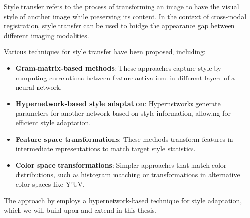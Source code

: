 Style transfer refers to the process of transforming an image to have the visual style of another image while preserving its content. In the context of cross-modal registration, style transfer can be used to bridge the appearance gap between different imaging modalities.

Various techniques for style transfer have been proposed, including:

\begin{itemize}
    \item \textbf{Gram-matrix-based methods}: These approaches capture style by computing correlations between feature activations in different layers of a neural network.
    
    \item \textbf{Hypernetwork-based style adaptation}: Hypernetworks generate parameters for another network based on style information, allowing for efficient style adaptation.
    
    \item \textbf{Feature space transformations}: These methods transform features in intermediate representations to match target style statistics.
    
    \item \textbf{Color space transformations}: Simpler approaches that match color distributions, such as histogram matching or transformations in alternative color spaces like Y'UV.
\end{itemize}

The approach by \textcite{fehrentz2024intraoperative} employs a hypernetwork-based technique for style adaptation, which we will build upon and extend in this thesis. 